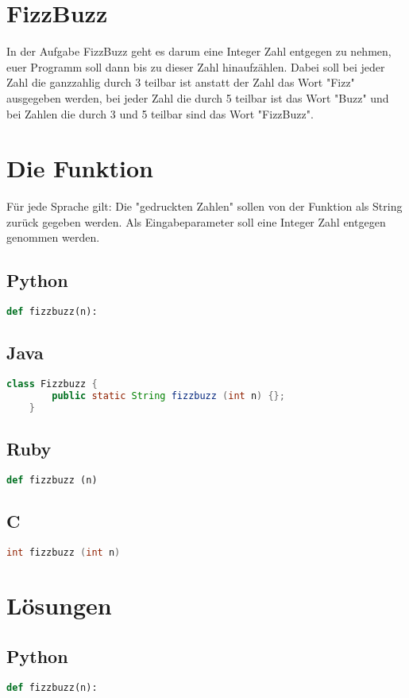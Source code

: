 \documentclass[a4paper]{article}
\author{Eric Lanfer}
\begin{document}
\section*{FizzBuzz}
In der Aufgabe FizzBuzz geht es darum eine Integer Zahl entgegen zu nehmen, euer Programm soll dann bis zu dieser Zahl hinaufzählen. Dabei soll bei jeder Zahl die ganzzahlig durch 3 teilbar ist anstatt der Zahl das Wort "Fizz" ausgegeben werden, bei jeder Zahl die durch 5 teilbar ist das Wort "Buzz" und bei Zahlen die durch 3 und 5 teilbar sind das Wort "FizzBuzz".
\section*{Die Funktion}
Für jede Sprache gilt: Die "gedruckten Zahlen" sollen von der Funktion als String zurück gegeben werden. Als Eingabeparameter soll eine Integer Zahl entgegen genommen werden.
\subsection*{Python}
\begin{lstlisting}[language=Python]
	def fizzbuzz(n):
\end{lstlisting}
\subsection*{Java}
\begin{lstlisting}[language=Java]
	class Fizzbuzz {
		public static String fizzbuzz (int n) {};
	}
\end{lstlisting}
\subsection*{Ruby}
\begin{lstlisting}[language=Ruby]
	def fizzbuzz (n)
\end{lstlisting}
\subsection*{C}
\begin{lstlisting}[language=C]
	int fizzbuzz (int n)
\end{lstlisting}
\newpage
\onecolumn
\section*{Lösungen}
\subsection*{Python}
\begin{lstlisting}[language=Python]
	def fizzbuzz(n):
\end{lstlisting}
\end{document}

